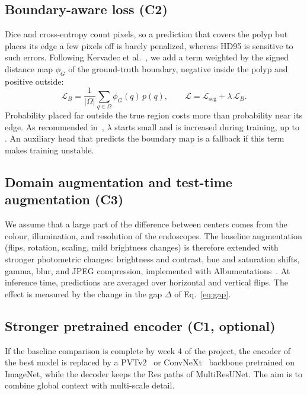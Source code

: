 \documentclass[10pt,twoside]{article}
\begin{document}
\subsection{Boundary-aware loss (C2)}
Dice and cross-entropy count pixels, so a prediction that covers the polyp but places
its edge a few pixels off is barely penalized, whereas HD95 is sensitive to such
errors. Following Kervadec et al.~\cite{kervadec2021boundary}, we add a term weighted
by the signed distance map $\phi_G$ of the ground-truth boundary, negative inside the
polyp and positive outside:
\begin{equation}\label{eq:boundary}
  \mathcal{L}_{B} = \frac{1}{|\Omega|}\sum_{q\in\Omega}\phi_G(q)\,p(q),
  \qquad
  \mathcal{L} = \mathcal{L}_{\text{seg}} + \lambda\,\mathcal{L}_{B}.
\end{equation}
Probability placed far outside the true region costs more than probability near its
edge. As recommended in~\cite{kervadec2021boundary}, $\lambda$ starts small and is
increased during training, up to \ph{[value]}. An auxiliary head that predicts the
boundary map is a fallback if this term makes training unstable.

\subsection{Domain augmentation and test-time augmentation (C3)}
We assume that a large part of the difference between centers comes from the colour,
illumination, and resolution of the endoscopes. The baseline augmentation (flips,
rotation, scaling, mild brightness changes) is therefore extended with stronger
photometric changes: brightness and contrast, hue and saturation shifts, gamma, blur,
and JPEG compression, implemented with Albumentations~\cite{buslaev2020albumentations}.
At inference time, predictions are averaged over horizontal and vertical flips. The
effect is measured by the change in the gap $\Delta$ of Eq.~\eqref{eq:gap}.

\subsection{Stronger pretrained encoder (C1, optional)}
If the baseline comparison is complete by week 4 of the project, the encoder of the
best model is replaced by a PVTv2~\cite{wang2022pvtv2} or ConvNeXt~\cite{liu2022convnext}
backbone pretrained on ImageNet, while the decoder keeps the Res paths of
MultiResUNet. The aim is to combine global context with multi-scale detail.
\end{document}
